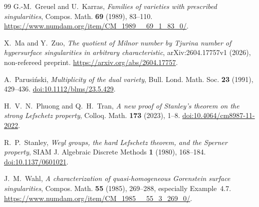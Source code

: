 \documentclass[11pt]{article}
\theoremstyle{remark}
\begin{document}
\begin{thebibliography}{99}
G.-M.~Greuel and U.~Karras,
\emph{Families of varieties with prescribed singularities},
Compos. Math. \textbf{69} (1989), 83--110.
\url{https://www.numdam.org/item/CM_1989__69_1_83_0/}.

X.~Ma and Y.~Zuo,
\emph{The quotient of Milnor number by Tjurina number of hypersurface
singularities in arbitrary characteristic},
arXiv:2604.17757v1 (2026), non-refereed preprint.
\url{https://arxiv.org/abs/2604.17757}.

A.~Parusi\'nski,
\emph{Multiplicity of the dual variety},
Bull. Lond. Math. Soc. \textbf{23} (1991), 429--436.
\href{https://doi.org/10.1112/blms/23.5.429}
{doi:10.1112/blms/23.5.429}.

H.~V.~N.~Phuong and Q.~H.~Tran,
\emph{A new proof of Stanley's theorem on the strong Lefschetz property},
Colloq. Math. \textbf{173} (2023), 1--8.
\href{https://doi.org/10.4064/cm8987-11-2022}
{doi:10.4064/cm8987-11-2022}.

R.~P.~Stanley,
\emph{Weyl groups, the hard Lefschetz theorem, and the Sperner property},
SIAM J. Algebraic Discrete Methods \textbf{1} (1980), 168--184.
\href{https://doi.org/10.1137/0601021}{doi:10.1137/0601021}.

J.~M.~Wahl,
\emph{A characterization of quasi-homogeneous Gorenstein surface
singularities},
Compos. Math. \textbf{55} (1985), 269--288, especially Example~4.7.
\url{https://www.numdam.org/item/CM_1985__55_3_269_0/}.

\end{thebibliography}
\end{document}
